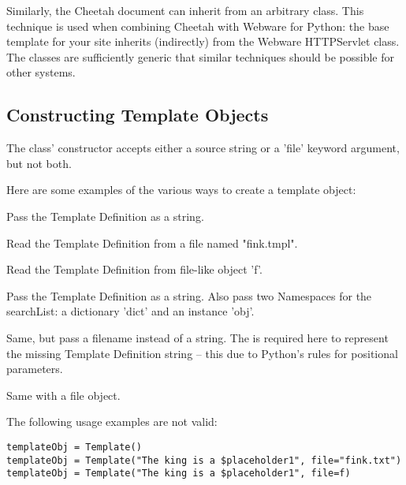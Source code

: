 Similarly, the Cheetah document can inherit from an arbitrary class. This
technique is used when combining Cheetah with Webware for Python: the base
template for your site inherits (indirectly) from the Webware HTTPServlet class.
The classes are sufficiently generic that similar techniques should be possible
for other systems.

\subsection{Constructing Template Objects}
\label{howWorks.constructing}

The  class' constructor accepts either a source string or a
'file' keyword argument, but not both.

Here are some examples of the various ways to create a template object:
\begin{description}
\item{}
     Pass the Template Definition as a string.
\item{}
     Read the Template Definition from a file named "fink.tmpl".  
\item{}
     Read the Template Definition from file-like object 'f'.
\item{}
     Pass the Template Definition as a string.  Also pass two Namespaces for the
     searchList: a dictionary 'dict' and an instance 'obj'.
\item{}
     Same, but pass a filename instead of a string.  The  is required
     here to represent the missing Template Definition string -- this due to
     Python's rules for positional parameters.
\item{}
     Same with a file object.
\end{description}

The following usage examples are not valid:
\begin{verbatim}
templateObj = Template() 
templateObj = Template("The king is a $placeholder1", file="fink.txt")
templateObj = Template("The king is a $placeholder1", file=f)
\end{verbatim}



